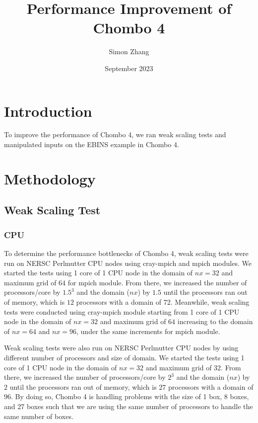 \documentclass{article}
\begin{document}
\title{Performance Improvement of Chombo 4}
\author{Simon Zhang}
\date{September 2023}

\maketitle

\section{Introduction}
To improve the performance of Chombo 4, we ran weak scaling tests and manipulated inputs on the EBINS example in Chombo 4.

\section{Methodology}
\subsection{Weak Scaling Test}
\subsubsection{CPU}
To determine the performance bottlenecks of Chombo 4, weak scaling tests were run on NERSC Perlmutter CPU nodes using cray-mpich and mpich modules. We started the tests using 1 core of 1 CPU node in the domain of $nx = 32$ and maximum grid of $64$ for mpich module. From there, we increased the number of processors/core by $1.5^3$ and the domain ($nx$) by $1.5$ until the processors ran out of memory, which is $12$ processors with a domain of 72. Meanwhile, weak scaling tests were conducted using cray-mpich module starting from 1 core of 1 CPU node in the domain of $nx=32$ and maximum grid of $64$ increasing to the domain of $nx=64$ and $nx=96$, under the same increments for mpich module.

Weak scaling tests were also run on NERSC Perlmutter CPU nodes by using different number of processors and size of domain. We started the tests using 1 core of 1 CPU node in the domain of $nx = 32$ and maximum grid of $32$. From there, we increased the number of processors/core by $2^3$ and the domain ($nx$) by $2$ until the processors ran out of memory, which is $27$ processors with a domain of $96$. By doing so, Chombo 4 is handling problems with the size of 1 box, 8 boxes, and 27 boxes such that we are using the same number of processors to handle the same number of boxes.
\end{document}
